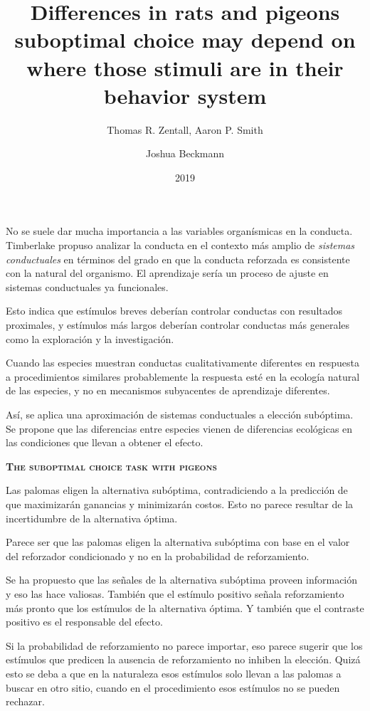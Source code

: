 \documentclass[a4paper,12pt]{article}
\title{Differences in rats and pigeons suboptimal choice may depend on where those stimuli are in their behavior system}
\author{Thomas R. Zentall, Aaron P. Smith \and Joshua Beckmann}
\date{2019}
\begin{document}
{\scshape\bfseries \maketitle}

No se suele dar mucha importancia a las variables organísmicas en la conducta.
Timberlake propuso analizar la conducta en el contexto más amplio de {\itshape sistemas conductuales} en términos del grado en que la conducta reforzada es consistente con la natural del organismo.
El aprendizaje sería un proceso de ajuste en sistemas conductuales ya funcionales.

Esto indica que estímulos breves deberían controlar conductas con resultados proximales, y estímulos más largos deberían controlar conductas más generales como la exploración y la investigación.

Cuando las especies muestran conductas cualitativamente diferentes en respuesta a procedimientos similares probablemente la respuesta esté en la ecología natural de las especies, y no en mecanismos subyacentes de aprendizaje diferentes.

Así, se aplica una aproximación de sistemas conductuales a elección subóptima.
Se propone que las diferencias entre especies vienen de diferencias ecológicas en las condiciones que llevan a obtener el efecto.

{\scshape\bfseries The suboptimal choice task with pigeons}

Las palomas eligen la alternativa subóptima, contradiciendo a la predicción de que maximizarán ganancias y minimizarán costos.
Esto no parece resultar de la incertidumbre de la alternativa óptima.

Parece ser que las palomas eligen la alternativa subóptima con base en el valor del reforzador condicionado y no en la probabilidad de reforzamiento.

Se ha propuesto que las señales de la alternativa subóptima proveen información y eso las hace valiosas.
También que el estímulo positivo señala reforzamiento más pronto que los estímulos de la alternativa óptima.
Y también que el contraste positivo es el responsable del efecto.

Si la probabilidad de reforzamiento no parece importar, eso parece sugerir que los estímulos que predicen la ausencia de reforzamiento no inhiben la elección.
Quizá esto se deba a que en la naturaleza esos estímulos solo llevan a las palomas a buscar en otro sitio, cuando en el procedimiento esos estímulos no se pueden rechazar.
\end{document}
